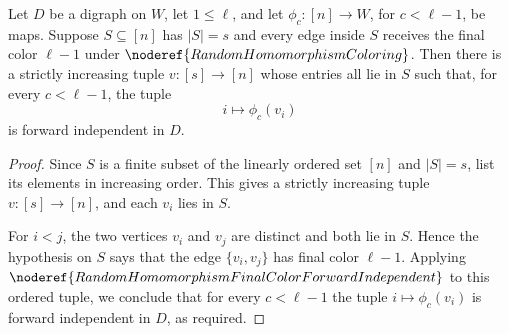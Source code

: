 \begin{helper}
Let \(D\) be a digraph on \(W\), let \(1\le\ell\), and let
\(\phi_c:[n]\to W\), for \(c<\ell-1\), be maps.  Suppose
\(S\subseteq[n]\) has \(|S|=s\) and every edge inside \(S\) receives the final
color \(\ell-1\) under \(\noderef{RandomHomomorphismColoring}\).  Then there
is a strictly increasing tuple \(v:[s]\to[n]\) whose entries all lie in \(S\)
such that, for every \(c<\ell-1\), the tuple
\[
  i\mapsto \phi_c(v_i)
\]
is forward independent in \(D\).
\end{helper}
\begin{proof}
Since \(S\) is a finite subset of the linearly ordered set \([n]\) and
\(|S|=s\), list its elements in increasing order.  This gives a strictly
increasing tuple \(v:[s]\to[n]\), and each \(v_i\) lies in \(S\).

For \(i<j\), the two vertices \(v_i\) and \(v_j\) are distinct and both lie in
\(S\).  Hence the hypothesis on \(S\) says that the edge
\(\{v_i,v_j\}\) has final color \(\ell-1\).  Applying
\(\noderef{RandomHomomorphismFinalColorForwardIndependent}\) to this ordered
tuple, we conclude that for every \(c<\ell-1\) the tuple
\(i\mapsto \phi_c(v_i)\) is forward independent in \(D\), as required.
\end{proof}
